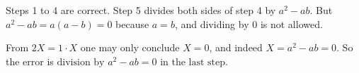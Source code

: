 Steps 1 to 4 are correct. Step 5 divides both sides of step 4 by $a^2-ab$. But $a^2-ab=a(a-b)=0$ because $a=b$, and dividing by $0$ is not allowed.

From $2X=1\cdot X$ one may only conclude $X=0$, and indeed $X=a^2-ab=0$. So the error is $\boxed{\text{division by }a^2-ab=0\text{ in the last step}}$.
